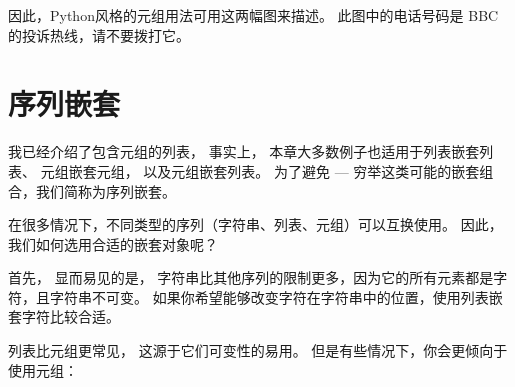 {因此，Python风格的元组用法可用这两幅图来描述。  
此图中的电话号码是 BBC 的投诉热线，请不要拨打它。


\section{序列嵌套}


我已经介绍了包含元组的列表， 事实上， 本章大多数例子也适用于列表嵌套列表、 元组嵌套元组， 以及元组嵌套列表。  
为了避免 --- 穷举这类可能的嵌套组合，我们简称为序列嵌套。


在很多情况下，不同类型的序列（字符串、列表、元组）可以互换使用。 因此，我们如何选用合适的嵌套对象呢？
   


首先， 显而易见的是， 字符串比其他序列的限制更多，因为它的所有元素都是字符，且字符串不可变。  
如果你希望能够改变字符在字符串中的位置，使用列表嵌套字符比较合适。


列表比元组更常见， 这源于它们可变性的易用。  
但是有些情况下，你会更倾向于使用元组：


}
